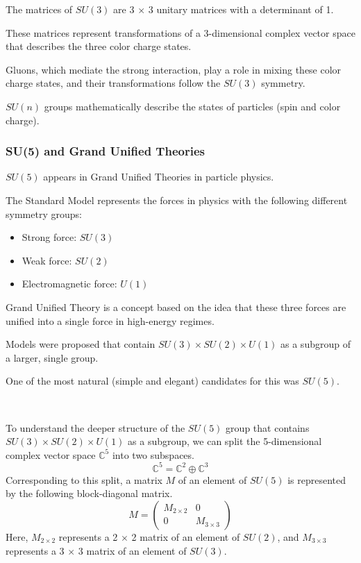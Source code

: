 \documentclass[uplatex,a4j,12pt,dvipdfmx]{jsarticle}
\begin{document}
The matrices of $SU(3)$ are 3 $\times$ 3 unitary matrices with a determinant of 1.

These matrices represent transformations of a 3-dimensional complex vector space that describes the three color charge states.

Gluons, which mediate the strong interaction, play a role in mixing these color charge states, and their transformations follow the $SU(3)$ symmetry.

$SU(n)$ groups mathematically describe the states of particles (spin and color charge).

\subsubsection{\textbf{SU(5) and Grand Unified Theories}}

$SU(5)$ appears in Grand Unified Theories in particle physics.

The Standard Model represents the forces in physics with the following different symmetry groups:
\begin{itemize}
	\item Strong force: $SU(3)$
	\item Weak force: $SU(2)$
	\item Electromagnetic force: $U(1)$
\end{itemize}

Grand Unified Theory is a concept based on the idea that these three forces are unified into a single force in high-energy regimes.

Models were proposed that contain $SU(3) \times SU(2) \times U(1)$ as a subgroup of a larger, single group.

One of the most natural (simple and elegant) candidates for this was $SU(5)$.

\ \ 

To understand the deeper structure of the $SU(5)$ group that contains $SU(3) \times SU(2) \times U(1)$ as a subgroup, we can split the 5-dimensional complex vector space $\mathbb{C}^{5}$ into two subspaces.
$$ \mathbb{C}^{5} = \mathbb{C}^{2} \oplus \mathbb{C}^{3} $$
Corresponding to this split, a matrix $M$ of an element of $SU(5)$ is represented by the following block-diagonal matrix.
$$
	M =
	\left(
	\begin{array}{cc}
			M_{2 \times 2} & 0              \\
			0              & M_{3 \times 3}
		\end{array}
	\right)
$$
Here, $M_{2 \times 2}$ represents a 2 $\times$ 2 matrix of an element of $SU(2)$, and
$M_{3 \times 3}$ represents a 3 $\times$ 3 matrix of an element of $SU(3)$.
\end{document}

